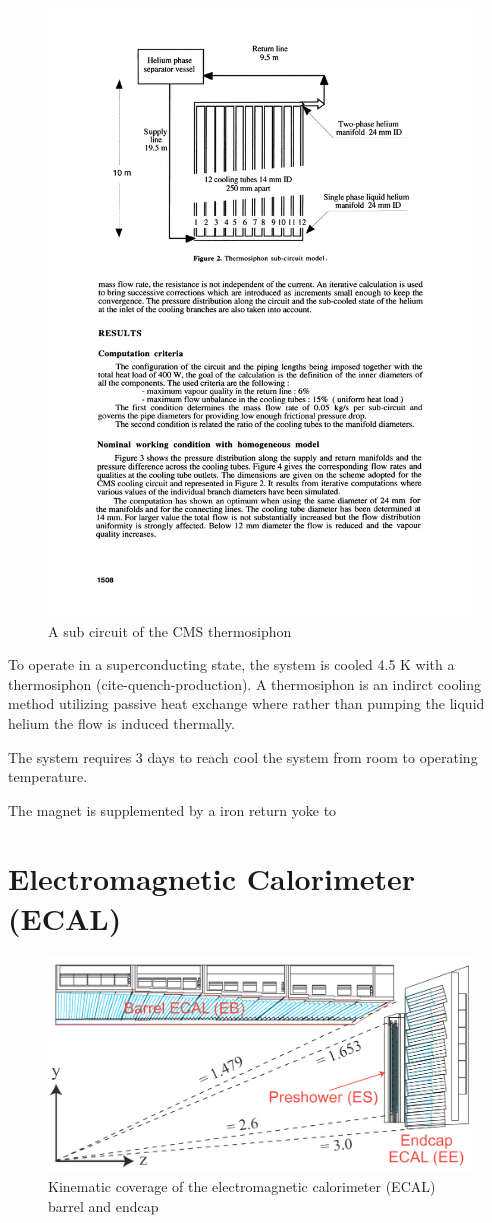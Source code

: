 \begin{figure}
\begin{center}
\includegraphics[width=.55\textwidth]{pics/thermosiphon}
\end{center}
\caption{A sub circuit of the CMS thermosiphon}
\label{fig:eoverm}
\end{figure}

To operate in a superconducting state, the system is cooled  4.5 K with a thermosiphon
 (cite-quench-production). A thermosiphon is an indirct cooling method utilizing passive heat exchange where
rather than pumping the liquid helium the flow is induced thermally. 

The system requires 3 days to 
reach cool the system from room to operating temperature. 

The magnet is supplemented by a iron return yoke to



\section{Electromagnetic Calorimeter (ECAL)}


\begin{figure}
\begin{center}
\includegraphics[width=.95\textwidth]{pics/ecal_diagram_side}
\end{center}
\caption{Kinematic coverage of the electromagnetic calorimeter (ECAL) barrel and endcap}
\label{fig:ecal}
\end{figure}

